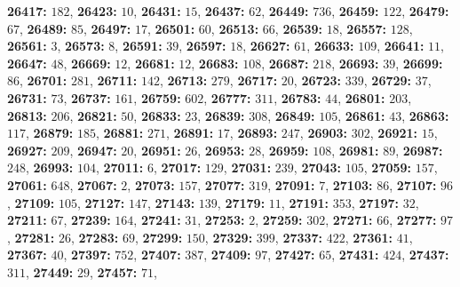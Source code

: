 \textsf{\bfseries 26417:} $182$, \textsf{\bfseries 26423:} $10$, \textsf{\bfseries 26431:} $15$, \textsf{\bfseries 26437:} $62$, \textsf{\bfseries 26449:} $736$, \textsf{\bfseries 26459:} $122$, \textsf{\bfseries 26479:} $67$, \textsf{\bfseries 26489:} $85$, \textsf{\bfseries 26497:} $17$, \textsf{\bfseries 26501:} $60$, \textsf{\bfseries 26513:} $66$, \textsf{\bfseries 26539:} $18$, \textsf{\bfseries 26557:} $128$, \textsf{\bfseries 26561:} $3$, \textsf{\bfseries 26573:} $8$, \textsf{\bfseries 26591:} $39$, \textsf{\bfseries 26597:} $18$, \textsf{\bfseries 26627:} $61$, \textsf{\bfseries 26633:} $109$, \textsf{\bfseries 26641:} $11$, \textsf{\bfseries 26647:} $48$, \textsf{\bfseries 26669:} $12$, \textsf{\bfseries 26681:} $12$, \textsf{\bfseries 26683:} $108$, \textsf{\bfseries 26687:} $218$, \textsf{\bfseries 26693:} $39$, \textsf{\bfseries 26699:} $86$, \textsf{\bfseries 26701:} $281$, \textsf{\bfseries 26711:} $142$, \textsf{\bfseries 26713:} $279$, \textsf{\bfseries 26717:} $20$, \textsf{\bfseries 26723:} $339$, \textsf{\bfseries 26729:} $37$, \textsf{\bfseries 26731:} $73$, \textsf{\bfseries 26737:} $161$, \textsf{\bfseries 26759:} $602$, \textsf{\bfseries 26777:} $311$, \textsf{\bfseries 26783:} $44$, \textsf{\bfseries 26801:} $203$, \textsf{\bfseries 26813:} $206$, \textsf{\bfseries 26821:} $50$, \textsf{\bfseries 26833:} $23$, \textsf{\bfseries 26839:} $308$, \textsf{\bfseries 26849:} $105$, \textsf{\bfseries 26861:} $43$, \textsf{\bfseries 26863:} $117$, \textsf{\bfseries 26879:} $185$, \textsf{\bfseries 26881:} $271$, \textsf{\bfseries 26891:} $17$, \textsf{\bfseries 26893:} $247$, \textsf{\bfseries 26903:} $302$, \textsf{\bfseries 26921:} $15$, \textsf{\bfseries 26927:} $209$, \textsf{\bfseries 26947:} $20$, \textsf{\bfseries 26951:} $26$, \textsf{\bfseries 26953:} $28$, \textsf{\bfseries 26959:} $108$, \textsf{\bfseries 26981:} $89$, \textsf{\bfseries 26987:} $248$, \textsf{\bfseries 26993:} $104$, \textsf{\bfseries 27011:} $6$, \textsf{\bfseries 27017:} $129$, \textsf{\bfseries 27031:} $239$, \textsf{\bfseries 27043:} $105$, \textsf{\bfseries 27059:} $157$, \textsf{\bfseries 27061:} $648$, \textsf{\bfseries 27067:} $2$, \textsf{\bfseries 27073:} $157$, \textsf{\bfseries 27077:} $319$, \textsf{\bfseries 27091:} $7$, \textsf{\bfseries 27103:} $86$, \textsf{\bfseries 27107:} $96$, \textsf{\bfseries 27109:} $105$, \textsf{\bfseries 27127:} $147$, \textsf{\bfseries 27143:} $139$, \textsf{\bfseries 27179:} $11$, \textsf{\bfseries 27191:} $353$, \textsf{\bfseries 27197:} $32$, \textsf{\bfseries 27211:} $67$, \textsf{\bfseries 27239:} $164$, \textsf{\bfseries 27241:} $31$, \textsf{\bfseries 27253:} $2$, \textsf{\bfseries 27259:} $302$, \textsf{\bfseries 27271:} $66$, \textsf{\bfseries 27277:} $97$, \textsf{\bfseries 27281:} $26$, \textsf{\bfseries 27283:} $69$, \textsf{\bfseries 27299:} $150$, \textsf{\bfseries 27329:} $399$, \textsf{\bfseries 27337:} $422$, \textsf{\bfseries 27361:} $41$, \textsf{\bfseries 27367:} $40$, \textsf{\bfseries 27397:} $752$, \textsf{\bfseries 27407:} $387$, \textsf{\bfseries 27409:} $97$, \textsf{\bfseries 27427:} $65$, \textsf{\bfseries 27431:} $424$, \textsf{\bfseries 27437:} $311$, \textsf{\bfseries 27449:} $29$, \textsf{\bfseries 27457:} $71$, 
